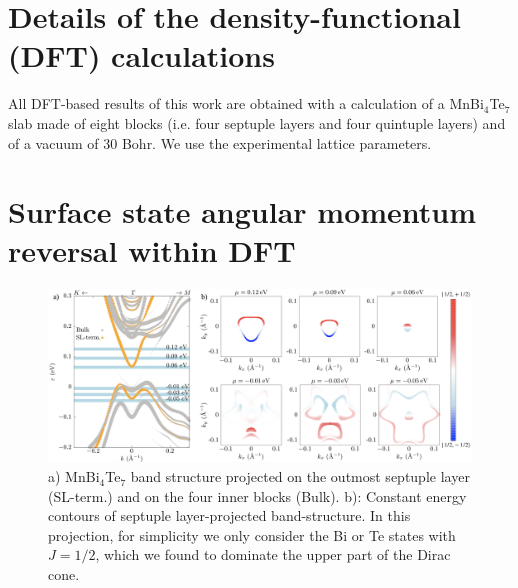 \documentclass[showpacs, preprintnumbers, pra, superscriptaddress, floatfix, onecolumn, longbibliography]{revtex4-1}
\begin{document}
\title{}


\maketitle

\section{Details of the density-functional (DFT) calculations}

All DFT-based results of this work are obtained with a calculation of a MnBi$_4$Te$_7$ slab made of eight blocks (i.e. four septuple layers and four quintuple layers) and of a vacuum of 30 Bohr. We use the experimental lattice parameters.

\section{Surface state angular momentum reversal within DFT}
\begin{figure}[h!]
 \centering
 \includegraphics[width=18 cm]{sl.png}
	\caption{a) MnBi$_4$Te$_7$ band structure projected on the outmost septuple layer (SL-term.) and on the four inner blocks (Bulk). 
	b): Constant energy contours of septuple layer-projected band-structure. In this projection, for simplicity we only consider the Bi or Te states with $J=1/2$, which we found to dominate the upper part of the Dirac cone.
	}
	\label{dft_sl}
\end{figure}



\end{document}
